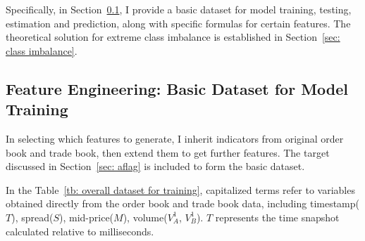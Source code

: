 Specifically, in Section~\ref{sec: training data}, I provide a basic dataset for model training, testing, estimation and prediction, along with specific formulas for certain features. The theoretical solution for extreme class imbalance is established in Section~\ref{sec: class imbalance}.

\subsection{Feature Engineering: Basic Dataset for Model Training} \label{sec: training data}
In selecting which features to generate, I inherit indicators from original order book and trade book, then extend them to get further features. The target discussed in Section~\ref{sec: aflag} is included to form the basic dataset.

In the Table~\ref{tb: overall dataset for training}, capitalized terms refer to variables obtained directly from the order book and trade book data, including timestamp($T$), spread($S$), mid-price($M$), volume($V_A^{1}$, $V_B^{1}$). $T$ represents the time snapshot calculated relative to milliseconds.

